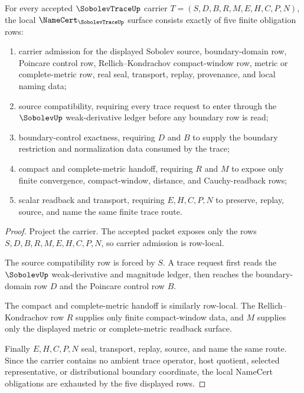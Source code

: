 \begin{theorem}
\label{thm:sobolev-trace-namecert-obligation-surface}
For every accepted $\SobolevTraceUp$ carrier $T=(S,D,B,R,M,E,H,C,P,N)$, the local $\NameCert_{\SobolevTraceUp}$ surface consists exactly of five finite obligation rows:
\begin{enumerate}
\item carrier admission for the displayed Sobolev source, boundary-domain row, Poincare control row, Rellich--Kondrachov compact-window row, metric or complete-metric row, real seal, transport, replay, provenance, and local naming data;
\item source compatibility, requiring every trace request to enter through the $\SobolevUp$ weak-derivative ledger before any boundary row is read;
\item boundary-control exactness, requiring $D$ and $B$ to supply the boundary restriction and normalization data consumed by the trace;
\item compact and complete-metric handoff, requiring $R$ and $M$ to expose only finite convergence, compact-window, distance, and Cauchy-readback rows;
\item scalar readback and transport, requiring $E,H,C,P,N$ to preserve, replay, source, and name the same finite trace route.
\end{enumerate}
\end{theorem}
\begin{proof}
Project the carrier. The accepted packet exposes only the rows $S,D,B,R,M,E,H,C,P,N$, so carrier admission is row-local.

The source compatibility row is forced by $S$. A trace request first reads the $\SobolevUp$ weak-derivative and magnitude ledger, then reaches the boundary-domain row $D$ and the Poincare control row $B$.

The compact and complete-metric handoff is similarly row-local. The Rellich--Kondrachov row $R$ supplies only finite compact-window data, and $M$ supplies only the displayed metric or complete-metric readback surface.

Finally $E,H,C,P,N$ seal, transport, replay, source, and name the same route. Since the carrier contains no ambient trace operator, host quotient, selected representative, or distributional boundary coordinate, the local NameCert obligations are exhausted by the five displayed rows.
\end{proof}

